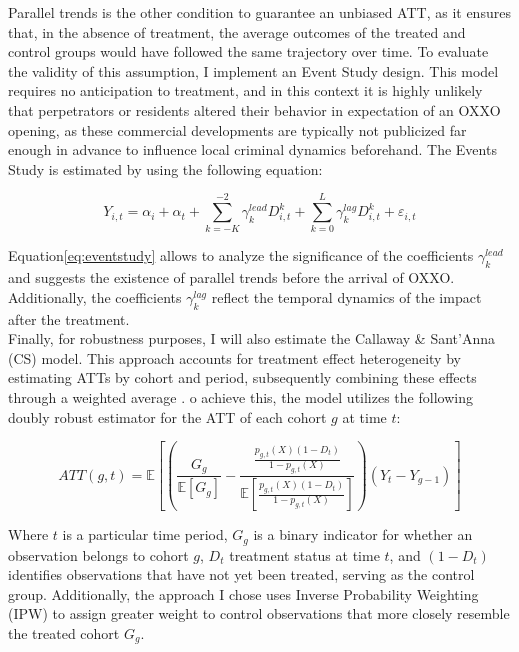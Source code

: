 \documentclass[12pt]{article}
\begin{document}
Parallel trends is the other condition to guarantee an unbiased ATT, as it ensures that, in the absence of treatment, the average outcomes of the treated and control groups would have followed the same trajectory over time. 
To evaluate the validity of this assumption, I implement an Event Study design. This model requires no anticipation to treatment, and in this context it is highly unlikely that perpetrators or residents altered their behavior in expectation of an OXXO opening, as these commercial developments are typically not publicized far enough in advance to influence local criminal dynamics beforehand. 
The Events Study is estimated by using the following equation:

\begin{equation}
Y_{i,t} = \alpha_i + \alpha_t 
+ \sum_{k=-K}^{-2} \gamma^{lead}_k D^k_{i,t} 
+ \sum_{k=0}^{L} \gamma^{lag}_k D^k_{i,t} 
+ \varepsilon_{i,t}
\label{eq:eventstudy}
\end{equation}

Equation\eqref{eq:eventstudy} allows to analyze the significance of the coefficients  $\gamma^{lead}_k$  and suggests the existence of parallel trends before the arrival of OXXO. 
Additionally, the coefficients $\gamma^{lag}_k$ reflect the temporal dynamics of the impact after the treatment.\\

Finally, for robustness purposes, I will also estimate the Callaway \& Sant’Anna (CS) model. This approach accounts for treatment effect heterogeneity by estimating ATTs by cohort and period, subsequently combining these effects through a weighted average \parencite{RiosAvila_Callaway_SantAnna_2021_csdid_slides,Callaway_SantAnna_2021}. o achieve this, the model utilizes the following doubly robust estimator for the ATT of each cohort $g$ at time $t$:

\begin{equation}
ATT(g, t) = \mathbb{E} \left[ \left( \frac{G_g}{\mathbb{E}[G_g]} - \frac{\frac{p_{g,t}(X)(1 - D_t)}{1 - p_{g,t}(X)}}{\mathbb{E} \left[ \frac{p_{g,t}(X)(1 - D_t)}{1 - p_{g,t}(X)} \right]} \right) (Y_t - Y_{g-1}) \right]
\end{equation}

Where $t$ is a particular time period, $ G_g$ is a binary indicator for whether an observation belongs to cohort $g$, $ D_t $ treatment status at time $t$, and  $(1 - D_t)$ identifies observations that have not yet been treated, serving as the control group. 
Additionally, the approach I chose uses Inverse Probability Weighting (IPW) to assign greater weight to control observations that more closely resemble the treated cohort $G_g$. 
\end{document}
